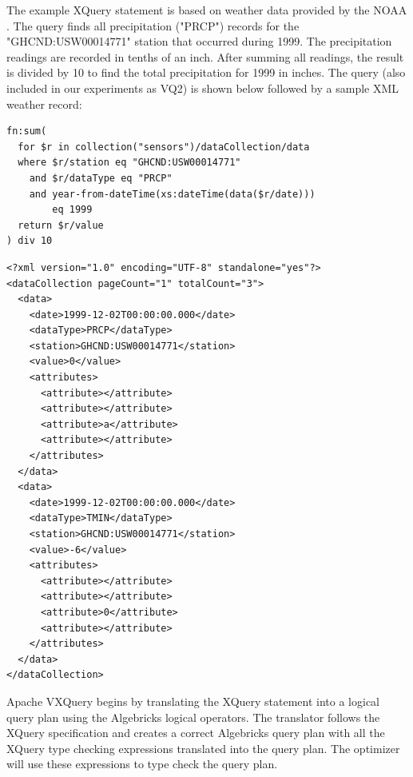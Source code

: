 The example XQuery statement is based on weather data provided by the NOAA \cite{NOAA-GHCND:website}.
The query finds all precipitation ("PRCP") records for the "GHCND:USW00014771" station that occurred during 1999.
The precipitation readings are recorded in tenths of an inch.
After summing all readings, the result is divided by 10 to find the total precipitation for 1999 in inches.
The query (also included in our experiments as VQ2) is shown below followed by a sample XML weather record:

\lstset{numbers=left, numberstyle=\tiny, stepnumber=1, numbersep=5pt}
\begin{center}
\scriptsize
\begin{lstlisting}
fn:sum(
  for $r in collection("sensors")/dataCollection/data
  where $r/station eq "GHCND:USW00014771" 
    and $r/dataType eq "PRCP" 
    and year-from-dateTime(xs:dateTime(data($r/date))) 
        eq 1999
  return $r/value
) div 10
\end{lstlisting}
\end{center}

\lstset{numbers=left, numberstyle=\tiny, stepnumber=1, numbersep=5pt}
\begin{center}
\scriptsize
\begin{lstlisting}
<?xml version="1.0" encoding="UTF-8" standalone="yes"?>
<dataCollection pageCount="1" totalCount="3">
  <data>
    <date>1999-12-02T00:00:00.000</date>
    <dataType>PRCP</dataType>
    <station>GHCND:USW00014771</station>
    <value>0</value>
    <attributes>
      <attribute></attribute>
      <attribute></attribute>
      <attribute>a</attribute>
      <attribute></attribute>
    </attributes>
  </data>
  <data>
    <date>1999-12-02T00:00:00.000</date>
    <dataType>TMIN</dataType>
    <station>GHCND:USW00014771</station>
    <value>-6</value>
    <attributes>
      <attribute></attribute>
      <attribute></attribute>
      <attribute>0</attribute>
      <attribute></attribute>
    </attributes>
  </data>
</dataCollection>
\end{lstlisting}
\end{center}

Apache VXQuery begins by translating the XQuery statement into a logical query plan using the Algebricks logical operators.
The translator follows the XQuery specification and creates a correct Algebricks query plan with all the XQuery type checking expressions translated into the query plan.
The optimizer will use these expressions to type check the query plan.

